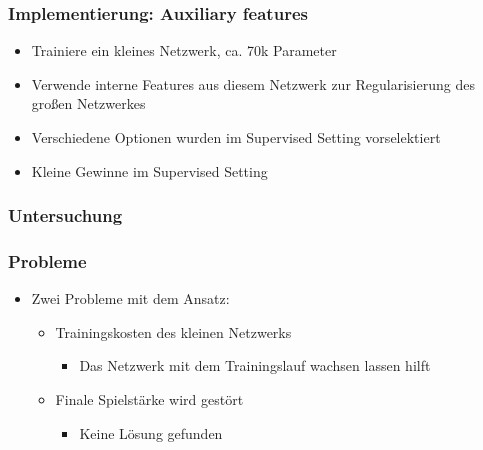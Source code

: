 \begin{frame}
 \frametitle{Implementierung: Auxiliary features}
  


\begin{itemize}
  \item \pause Trainiere ein kleines Netzwerk, ca. 70k Parameter
  \item \pause Verwende interne Features aus diesem Netzwerk zur Regularisierung des großen Netzwerkes
  \item \pause Verschiedene Optionen wurden im Supervised Setting vorselektiert
  \item \pause Kleine Gewinne im Supervised Setting
\end{itemize}

  
\end{frame}
\begin{frame}
 \frametitle{Untersuchung}
  


  
\end{frame}
\begin{frame}
 \frametitle{Probleme}
  


\begin{itemize}
  \item \pause Zwei Probleme mit dem Ansatz:
\begin{itemize}
  \item \pause Trainingskosten des kleinen Netzwerks
\begin{itemize}
  \item \pause Das Netzwerk mit dem Trainingslauf wachsen lassen hilft
\end{itemize}
  \item \pause Finale Spielstärke wird gestört
\begin{itemize}
  \item \pause Keine Lösung gefunden
\end{itemize}
\end{itemize}
\end{itemize}


  
\end{frame}

